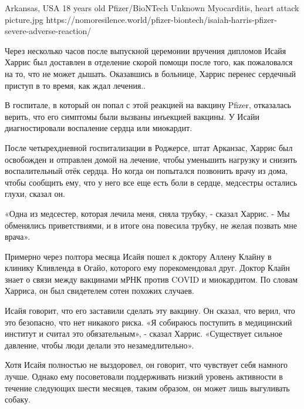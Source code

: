           {Arkansas, USA}
          {18 years old}
          {Pfizer/BioNTech}
          {Unknown}
          {Myocarditis, heart attack}
          {picture.jpg}
          {https://nomoresilence.world/pfizer-biontech/isaiah-harris-pfizer-severe-adverse-reaction/}
          {


Через несколько часов после выпускной церемонии вручения дипломов Исайя Харрис
был доставлен в отделение скорой помощи после того, как пожаловался на то, что
не может дышать. Оказавшись в больнице, Харрис перенес сердечный приступ в то
время, как ждал лечения..

В госпитале, в который он попал с этой реакцией на вакцину Pfizer, отказалась
верить, что его симптомы были вызваны инъекцией вакцины. У Исайи диагностировали
воспаление сердца или миокардит.

После четырехдневной госпитализации в Роджерсе, штат Арканзас, Харрис был
освобожден и отправлен домой на лечение, чтобы уменьшить нагрузку и снизить
воспалительный отёк сердца. Но когда он попытался позвонить врачу из дома, чтобы
сообщить ему, что у него все еще есть боли в сердце, медсестры остались глухи,
сказал он.

«Одна из медсестер, которая лечила меня, сняла трубку, - сказал Харрис. - Мы
обменялись приветствиями, и в итоге она повесила трубку, не желая позвать мне
врача».

Примерно через полтора месяца Исайя пошел к доктору Аллену Клайну в клинику
Кливленда в Огайо, которого ему порекомендовал друг. Доктор Клайн знает о связи
между вакцинами мРНК против COVID и миокардитом. По словам Харриса, он был
свидетелем сотен похожих случаев.

Исайя говорит, что его заставили сделать эту вакцину. Он сказал, что верил, что
это безопасно, что нет никакого риска. «Я собираюсь поступить в медицинский
институт и считал это обязательным», - сказал Харрис. «Существует сильное
давление, чтобы люди делали это незамедлительно».

Хотя Исайя полностью не выздоровел, он говорит, что чувствует себя намного
лучше. Однако ему посоветовали поддерживать низкий уровень активности в течение
следующих шести месяцев, таким образом, он может лишь выгуливать собаку.

}
